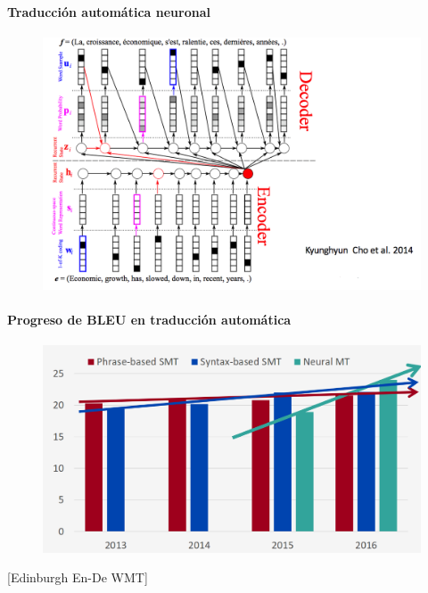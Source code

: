 \paragraph{Traducción automática neuronal}
         \begin{figure}[h]
        	\includegraphics[scale = 0.25]{pics/mt.png}
        \end{figure}

\paragraph{Progreso de BLEU en traducción automática}
         \begin{figure}[h]
        	\includegraphics[scale = 0.35]{pics/nmt_progress.png}
        \end{figure}
[Edinburgh En-De WMT]


